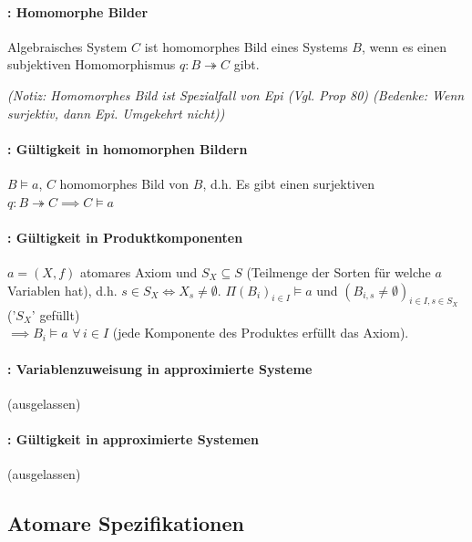 \paragraph{: Homomorphe Bilder }
Algebraisches System $C$ ist homomorphes Bild eines Systems $B$, wenn es einen subjektiven Homomorphismus $q: B \twoheadrightarrow C$ gibt.

\emph{(Notiz: Homomorphes Bild ist Spezialfall von Epi (Vgl. Prop 80) (Bedenke: Wenn surjektiv, dann Epi. Umgekehrt nicht)) }


\paragraph{: Gültigkeit in homomorphen Bildern}
$B \models a$, $C$ homomorphes Bild von $B$, d.h. Es gibt einen surjektiven \homo $q: B \twoheadrightarrow C \implies C \models a$

\paragraph{: Gültigkeit in Produktkomponenten}
$a = (X,f)$ atomares Axiom und $S_X \subseteq S$ (Teilmenge der Sorten für welche $a$ Variablen hat), d.h. $s \in S_X \Leftrightarrow X_s \neq \emptyset$.
$\Pi (B_i)_{i \in I} \models a$ und $(B_{i,s} \neq \emptyset)_{i \in I, s \in S_X}$ ('$S_X$' gefüllt) \\
$\implies  B_i \models a \, \, \forall \,  i \in I $ (jede Komponente des Produktes erfüllt das Axiom).

\paragraph{: Variablenzuweisung in approximierte Systeme}
(ausgelassen)

\paragraph{: Gültigkeit in approximierte Systemen}
(ausgelassen)


\subsection{Atomare Spezifikationen}

